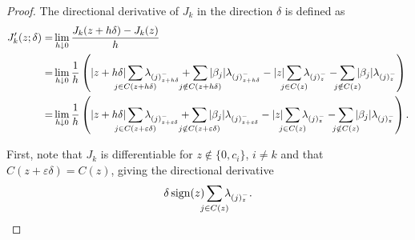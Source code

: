 \begin{proof}
  The directional derivative of \(J_k\) in the direction \(\delta\) is defined as
  \begin{align}
    J_k'(z; \delta)
    = & \lim_{h \downarrow 0} \frac{J_k(z + h \delta) - J_k(z)}{h} \nonumber \\
    = &
    \lim_{h \downarrow 0} \frac{1}{h}
    \left(
      |z + h \delta| \smashoperator{\sum_{j \in C(z + h \delta)}} \lambda_{(j)^-_{z + h \delta}}
      + \smashoperator{\sum_{j \notin C(z + h\delta)}} |\beta_j| \lambda_{(j)^-_{z + h \delta}}
      - |z| \smashoperator{\sum_{j \in C(z)}} \lambda_{(j)^-_z}
      - \smashoperator{\sum_{j \notin C(z)}} |\beta_j| \lambda_{(j)^-_z}
    \right) \nonumber                                                        \\
    = & \lim_{h \downarrow 0}
    \frac{1}{h}
    \left(
      |z + h \delta| \smashoperator{\sum_{j \in C(z + \varepsilon\delta)}} \lambda_{(j)^-_{z + \varepsilon\delta}}
      + \smashoperator{\sum_{j \notin C(z + \varepsilon\delta)}} |\beta_j| \lambda_{(j)^-_{z + \varepsilon\delta}}
      - |z| \smashoperator{\sum_{j \in C(z)}} \lambda_{(j)^-_{z}}
      - \smashoperator{\sum_{j \notin C(z)}} |\beta_j| \lambda_{(j)^-_{z}}
    \right).
    \label{eq:directional-derivative-sl1}
  \end{align}

  First, note that \(J_k\) is differentiable for \(z \notin \{0, c_i\}\), \(i
  \neq k\) and that \(C(z + \varepsilon\delta) = C(z)\), giving
  the directional derivative
  \[
    \delta \sign(z) \smashoperator{\sum_{j \in C(z)}} \lambda_{(j)^-_{z}}.
  \]


\end{proof}
